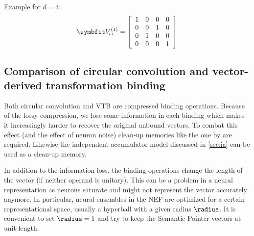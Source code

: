 Example for $d = 4$:
\begin{equation*}
    \mat V_{\!\leftrightarrow}^{(4)} = \sbr{\begin{array}{cccc}
            1 & 0 & 0 & 0 \\
            0 & 0 & 1 & 0 \\
            0 & 1 & 0 & 0 \\
            0 & 0 & 0 & 1
        \end{array}}
\end{equation*}

\subsection{Comparison of circular convolution and vector-derived transformation binding}
Both circular convolution and VTB are compressed binding operations.
Because of the lossy compression, we lose some information in each binding which makes it increasingly harder to recover the original unbound vectors.
To combat this effect (and the effect of neuron noise) clean-up memories like the one by \textcite{stewart2011} are required.
Likewise the independent accumulator model discussed in \cref{sec:ia} can be used as a clean-up memory.

In addition to the information loss, the binding operations change the length of the vector (if neither operand is unitary).
This can be a problem in a neural representation as neurons saturate and might not represent the vector accurately anymore.
In particular, neural ensembles in the NEF are optimized for a certain representational space, usually a hyperball with a given radius $\radius$.
It is convenient to set $\radius = 1$ and try to keep the Semantic Pointer vectors at unit-length.

